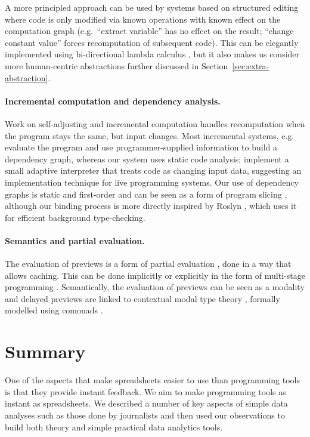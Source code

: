 \documentclass[english,crc]{programming}
\theoremstyle{plain}
\theoremstyle{definition}
\begin{document}
A more principled approach can be used by systems based on structured editing \cite{structure-based,interactive,livenut,lamdu}
where code is only modified via known operations with known effect on the computation graph
(e.g.~``extract variable'' has no effect on the result; ``change constant value''
forces recomputation of subsequent code). This can be elegantly implemented using bi-directional
lambda calculus \cite{hazelnut}, but it also makes us consider more human-centric abstractions
\cite{subtext,directprog} further discussed in Section~\ref{sec:extra-abstraction}.

\paragraph{Incremental computation and dependency analysis.}
Work on self-adjusting and incremental computation \cite{selfadjusting,adapton} handles
recomputation when the program stays the same, but input changes.
Most incremental systems, e.g.~\cite{incremental,adaptivefp,deltaml} evaluate the program and use
programmer-supplied information to build a dependency graph, whereas our system uses static code analysis;
\cite{adapton} implement a small adaptive interpreter
that treats code as changing input data, suggesting an implementation technique for
live programming systems. Our use of dependency graphs \cite{dependencies} is static and first-order
and can be seen as a form of program slicing \cite{slicing}, although our binding process is
more directly inspired by Roslyn \cite{roslyn}, which uses it for efficient background type-checking.

\paragraph{Semantics and partial evaluation.}
The evaluation of previews is a form of partial evaluation \cite{partial}, done in a
way that allows caching. This can be done implicitly or explicitly in the form of
multi-stage programming \cite{metaml}. Semantically, the evaluation of previews can be seen as a
modality \cite{modal} and delayed previews are linked to contextual modal type theory \cite{cmtt},
formally modelled using comonads \cite{cmtt-denotation}.



%
\section{Summary}
One of the aspects that make spreadsheets easier to use than programming tools is that they
provide instant feedback. We aim to make programming tools as instant as spreadsheets.
We described a number of key aspects of simple data analyses such as those done by journalists
and then used our observations to build both theory and simple practical data analytics tools.
\end{document}
